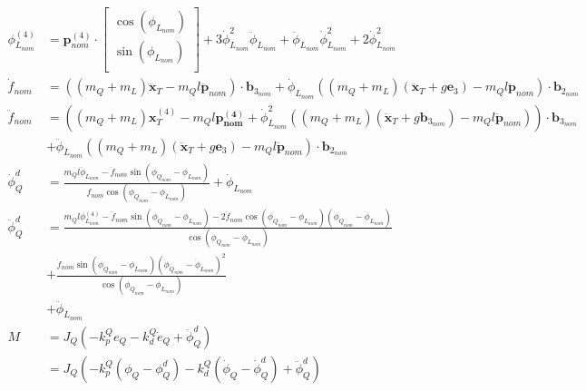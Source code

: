 \documentclass[11pt]{article}
\begin{document}
\begin{align*}
\phi_{L_{nom}}^{(4)} &= \mathbf{p}_{nom}^{(4)} \cdot 
\begin{bmatrix}
       \cos(\phi_{L_{nom}}) \\
       \sin(\phi_{L_{nom}}) \\
\end{bmatrix} 
+ 3 \dot{\phi}_{L_{nom}}^2 \ddot{\phi}_{L_{nom}} + \ddot{\phi}_{L_{nom}} \dot{\phi}_{L_{nom}}^2 + 2 \dot{\phi}_{L_{nom}}^2 \\
\dot{f}_{nom} &= ( (m_Q+m_L) \mathbf{\dddot{x}}_T - m_Q l \mathbf{\dddot{p}}_{nom} ) \cdot \mathbf{b}_{3_{nom}} + \dot{\phi}_{L_{nom}} ( (m_Q+m_L) ( \mathbf{\ddot{x}}_T+g \mathbf{e}_3) - m_Q l \mathbf{\ddot{p}}_{nom} ) \cdot \mathbf{b}_{2_{nom}} \\
\ddot{f}_{nom} &= ( (m_Q+m_L) \mathbf{x}_T^{(4)} - m_Q l \mathbf{{p}_{nom}^{(4)}} + \dot{\phi}_{L_{nom}}^2 ( (m_Q+m_L) (\mathbf{\ddot{x}}_T + g \mathbf{b}_{3_{nom}}) - m_Q l \mathbf{\ddot{p}}_{nom} ) ) \cdot \mathbf{b}_{3_{nom}} \\
& + \ddot{\phi}_{L_{nom}} ( (m_Q+m_L)(\mathbf{\ddot{x}}_T + g \mathbf{e}_3 ) - m_Q l \mathbf{\ddot{p}}_{nom}) \cdot \mathbf{b}_{2_{nom}} \\
\dot{\phi}_{Q}^d &= \frac{ m_Q l \dddot{\phi}_{L_{nom}} - \dot{f}_{nom} \sin(\phi_{Q_{nom}} - \phi_{L_{nom}}) } { f_{nom} \cos(\phi_{Q_{nom}} - \phi_{L_{nom}})} + \dot{\phi}_{L_{nom}} \\
\ddot{\phi}_{Q}^d &= \frac{ m_Q l \phi_{L_{nom}}^{(4)} - \ddot{f}_{nom} \sin(\phi_{Q_{nom}} - \phi_{L_{nom}}) - 2 \dot{f}_{nom} \cos(\phi_{Q_{nom}} - \phi_{L_{nom}}) ( \dot{\phi}_{Q_{nom}} - \dot{\phi}_{L_{nom}} ) }{ \cos(\phi_{Q_{nom}} - \phi_{L_{nom}}) }  \\
& +  \frac{ \dot{f}_{nom} \sin(\phi_{Q_{nom}} - \phi_{L_{nom}})(\dot{\phi}_{Q_{nom}} - \dot{\phi}_{L_{nom}})^2 } {\cos(\phi_{Q_{nom}} - \phi_{L_{nom}}) } \\
& + \ddot{\phi}_{L_{nom}} \\
M &= J_Q ( -k_p^Q e_Q - k_d^Q \dot{e}_Q + \ddot{\phi}_Q^d) \\
&= J_Q ( -k_p^Q (\phi_Q-\phi_Q^d) - k_d^Q (\dot{\phi}_Q-\dot{\phi}_Q^d)  + \ddot{\phi}_Q^d)
\end{align*}







\newpage
\end{document}
